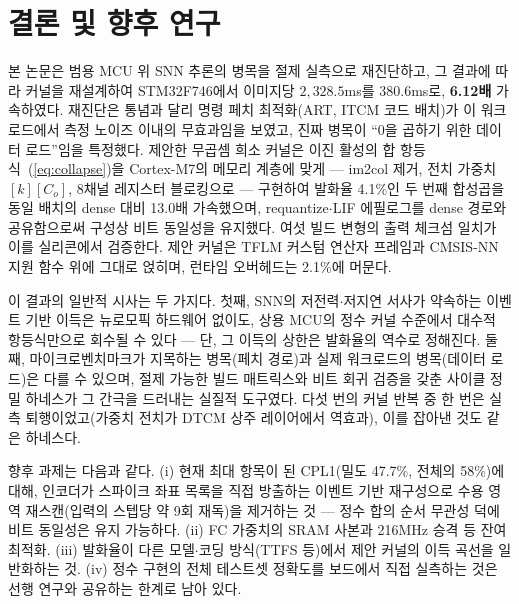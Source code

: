 \section{결론 및 향후 연구}\label{sec:conclusion}

본 논문은 범용 MCU 위 SNN 추론의 병목을 절제 실측으로 재진단하고,
그 결과에 따라 커널을 재설계하여 STM32F746에서 이미지당
$2{,}328.5$ms를 $380.6$ms로, \textbf{6.12배} 가속하였다. 재진단은
통념과 달리 명령 페치 최적화(ART, ITCM 코드 배치)가 이 워크로드에서
측정 노이즈 이내의 무효과임을 보였고, 진짜 병목이 ``0을 곱하기 위한
데이터 로드''임을 특정했다. 제안한 무곱셈 희소 커널은 이진 활성의 합
항등식~(\ref{eq:collapse})을 Cortex-M7의 메모리 계층에 맞게 --- im2col
제거, 전치 가중치 $[k][C_o]$, 8채널 레지스터 블로킹으로 --- 구현하여
발화율 4.1\%인 두 번째 합성곱을 동일 배치의 dense 대비 13.0배
가속했으며, requantize$\cdot$LIF
에필로그를 dense 경로와 공유함으로써 구성상 비트 동일성을 유지했다.
여섯 빌드 변형의 출력 체크섬 일치가 이를 실리콘에서 검증한다. 제안
커널은 TFLM 커스텀 연산자 프레임과 CMSIS-NN 지원 함수 위에 그대로
얹히며, 런타임 오버헤드는 2.1\%에 머문다.

이 결과의 일반적 시사는 두 가지다. 첫째, SNN의 저전력$\cdot$저지연
서사가 약속하는 이벤트 기반 이득은 뉴로모픽 하드웨어 없이도, 상용
MCU의 정수 커널 수준에서 대수적 항등식만으로 회수될 수 있다 ---
단, 그 이득의 상한은 발화율의 역수로 정해진다. 둘째, 마이크로벤치마크가
지목하는 병목(페치 경로)과 실제 워크로드의 병목(데이터 로드)은
다를 수 있으며, 절제 가능한 빌드 매트릭스와 비트 회귀 검증을 갖춘
사이클 정밀 하네스가 그 간극을 드러내는 실질적 도구였다. 다섯 번의
커널 반복 중 한 번은 실측 퇴행이었고(가중치 전치가 DTCM 상주
레이어에서 역효과), 이를 잡아낸 것도 같은 하네스다.

향후 과제는 다음과 같다. (i) 현재 최대 항목이 된 CPL1(밀도 47.7\%,
전체의 58\%)에 대해, 인코더가 스파이크 좌표 목록을 직접 방출하는
이벤트 기반 재구성으로 수용 영역 재스캔(입력의 스텝당 약 9회
재독)을 제거하는 것 --- 정수 합의 순서 무관성 덕에 비트 동일성은
유지 가능하다. (ii) FC 가중치의 SRAM 사본과 216MHz 승격 등 잔여
최적화. (iii) 발화율이 다른 모델$\cdot$코딩 방식(TTFS 등)에서 제안
커널의 이득 곡선을 일반화하는 것. (iv) 정수 구현의 전체 테스트셋
정확도를 보드에서 직접 실측하는 것은 선행 연구와 공유하는 한계로
남아 있다.
